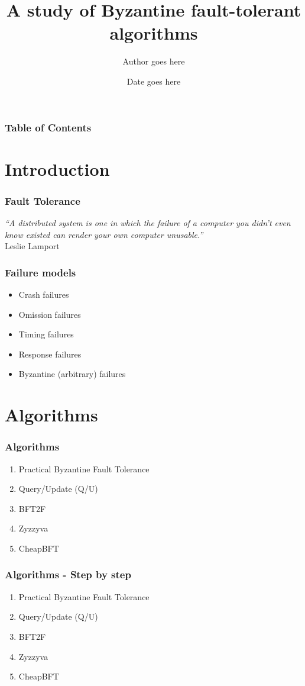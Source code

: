 \documentclass[blue]{beamer}
\title[A study of BFT algorithms]{A study of Byzantine fault-tolerant algorithms}
\subtitle{}
\author{Author goes here}
\institute[webpage]{Institute \\ Department}
\date{Date goes here}
\begin{document}
\begin{frame}
\titlepage
\end{frame}

\begin{frame}
\frametitle{Table of Contents}
\tableofcontents
\end{frame}

\section{Introduction}

\begin{frame}
 \frametitle{Fault Tolerance}
\noindent
 \textit{``A distributed system is one in which the failure of a computer you didn't even know existed can render your own computer unusable.''}
 \\Leslie Lamport
\end{frame}

\begin{frame}
 \frametitle{Failure models}
\begin{itemize}
 \item Crash failures
 \item Omission failures
 \item Timing failures
 \item Response failures
 \item Byzantine (arbitrary) failures
\end{itemize}
\end{frame}

\section{Algorithms}
\begin{frame}
 \frametitle{Algorithms}
\begin{enumerate}
 \item Practical Byzantine Fault Tolerance
 \item Query/Update (Q/U)
 \item BFT2F
 \item Zyzzyva
 \item CheapBFT
\end{enumerate}
\end{frame}

\begin{frame}
 \frametitle{Algorithms - Step by step}
\begin{enumerate}
 \item<1-> Practical Byzantine Fault Tolerance
 \item<2-> Query/Update (Q/U)
 \item<3-> BFT2F
 \item<3-> Zyzzyva
 \item<4-> CheapBFT
\end{enumerate}
\end{frame}
\end{document}
